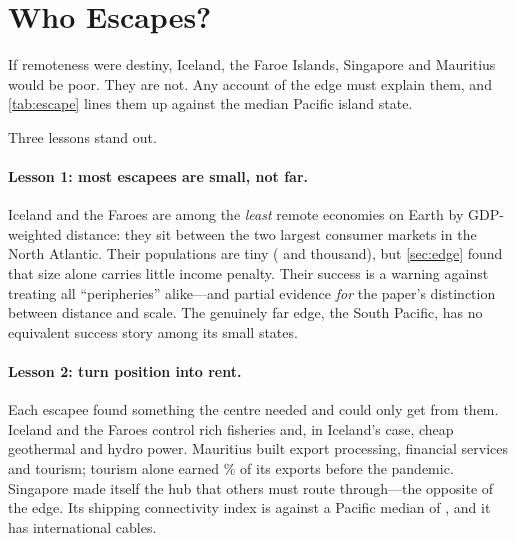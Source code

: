 \section{Who Escapes?}
\label{sec:escape}

If remoteness were destiny, Iceland, the Faroe Islands, Singapore and
Mauritius would be poor. They are not. Any account of the edge must explain
them, and \cref{tab:escape} lines them up against the median Pacific island
state.

\begin{table}[t]
\centering
\caption{ Selected indicators,
  \windowStart--\windowEnd{} averages unless stated; Pacific column is the
  median across Pacific small island states.}
\label{tab:escape}
\small\sffamily

\end{table}

Three lessons stand out.

\paragraph{Lesson 1: most escapees are small, not far.} Iceland and the
Faroes are among the \emph{least} remote economies on Earth by GDP-weighted
distance: they sit between the two largest consumer markets in the North
Atlantic. Their populations are tiny (\popIcelandK{} and \popFaroesK{}
thousand), but \cref{sec:edge} found that size alone carries little income
penalty. Their success is a warning against treating all \enquote{peripheries}
alike---and partial evidence \emph{for} the paper's distinction between
distance and scale. The genuinely far edge, the South Pacific, has no
equivalent success story among its small states.

\paragraph{Lesson 2: turn position into rent.} Each escapee found something
the centre needed and could only get from them. Iceland and the Faroes
control rich fisheries and, in Iceland's case, cheap geothermal and hydro
power. Mauritius built export processing, financial services and tourism;
tourism alone earned \tourismMauritius\% of its exports before the pandemic.
Singapore made itself the hub that others must route through---the
opposite of the edge. Its shipping connectivity index is \lsciSingapore{} against a Pacific median
of \pacificMedianLSCI, and it has \cablesSingapore{} international cables.

